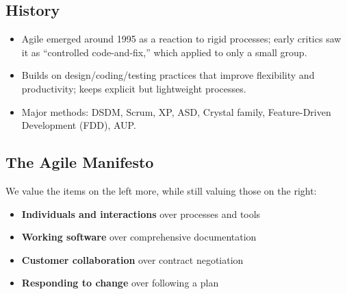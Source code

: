\documentclass[hidelinks]{article}
\begin{document}
\subsection{History}
\begin{itemize}
  \item Agile emerged around 1995 as a reaction to rigid processes; early critics saw it as
        ``controlled code-and-fix,'' which applied to only a small group.
  \item Builds on design/coding/testing practices that improve flexibility and productivity;
        keeps explicit but lightweight processes.
  \item Major methods: DSDM, Scrum, XP, ASD, Crystal family, Feature-Driven Development (FDD), AUP.
\end{itemize}

\subsection{The Agile Manifesto}
We value the items on the left more, while still valuing those on the right:
\begin{itemize}
  \item \textbf{Individuals and interactions} over processes and tools
  \item \textbf{Working software} over comprehensive documentation
  \item \textbf{Customer collaboration} over contract negotiation
  \item \textbf{Responding to change} over following a plan
\end{itemize}
\end{document}
